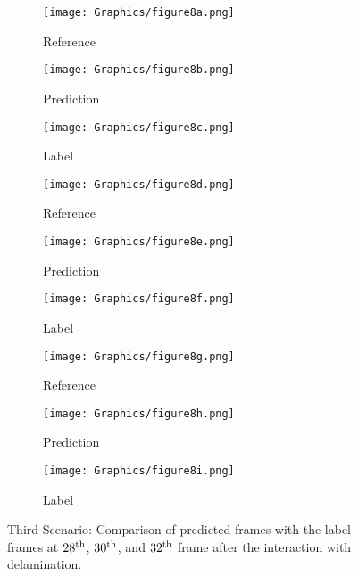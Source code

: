 \begin{figure} [!ht]
	\centering
	\begin{subfigure}[b]{0.32\textwidth}
		\centering
		\texttt{[image: Graphics/figure8a.png]}
		\caption{Reference}
		\label{fig:third_scenario_ref_28}
	\end{subfigure}
	\hfill
	\begin{subfigure}[b]{0.32\textwidth}
		\centering
		\texttt{[image: Graphics/figure8b.png]}
		\caption{Prediction}
		\label{fig:third_scenario_pred_28}
	\end{subfigure}
	\hfill
	\begin{subfigure}[b]{0.32\textwidth}
		\centering
		\texttt{[image: Graphics/figure8c.png]}
		\caption{Label}
		\label{fig:third_scenario_lab_28}
	\end{subfigure}	
	\hfill
	\begin{subfigure}[b]{0.32\textwidth}
		\centering
		\texttt{[image: Graphics/figure8d.png]}
		\caption{Reference}
		\label{fig:third_scenario_ref_30}
	\end{subfigure}
	\hfill
	\begin{subfigure}[b]{0.32\textwidth}
		\centering
		\texttt{[image: Graphics/figure8e.png]}
		\caption{Prediction}
		\label{fig:third_scenario_pred_30}
	\end{subfigure}
	\hfill
	\begin{subfigure}[b]{0.32\textwidth}
		\centering
		\texttt{[image: Graphics/figure8f.png]}
		\caption{Label}
		\label{fig:third_scenario_lab_30}
	\end{subfigure}

		\hfill
	\begin{subfigure}[b]{0.32\textwidth}
		\centering
		\texttt{[image: Graphics/figure8g.png]}
		\caption{Reference}
		\label{fig:third_scenario_ref_32}
	\end{subfigure}
	\hfill
	\begin{subfigure}[b]{0.32\textwidth}
		\centering
		\texttt{[image: Graphics/figure8h.png]}
		\caption{Prediction}
		\label{fig:third_scenario_pred_32}
	\end{subfigure}
	\hfill
	\begin{subfigure}[b]{0.32\textwidth}
		\centering
		\texttt{[image: Graphics/figure8i.png]}
		\caption{Label}
		\label{fig:third_scenario_lab_32}
	\end{subfigure}
	
	\caption{Third Scenario: Comparison of predicted frames with the label 
		frames at $28\textsuperscript{th}$, $30\textsuperscript{th}$, and 
		$32\textsuperscript{th}$ frame after the interaction with delamination.}
	\label{fig:third_scenario}
\end{figure}
